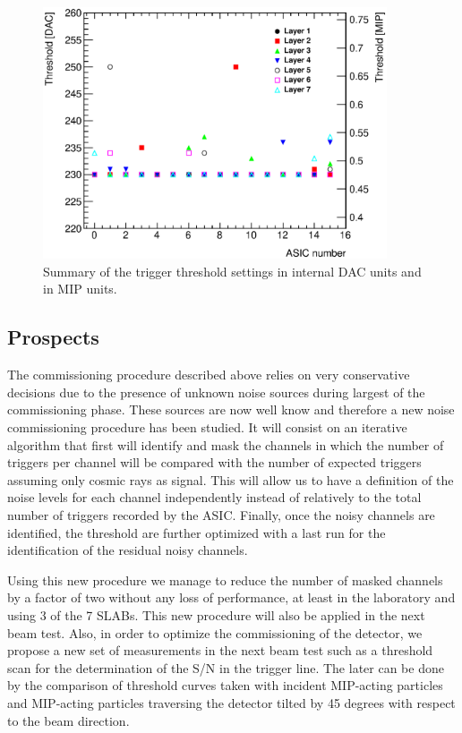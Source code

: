 \documentclass[a4paper,11pt]{article}
\begin{document}
\begin{figure}[!t]
  \centering
  \includegraphics[width=4in]{../figs/commissioning/threshold_chip.eps}
  \caption{Summary of the trigger threshold settings in internal DAC units and in MIP units.}
\label{trigger_thresholds}
\end{figure}


\subsection{Prospects}
\label{sec:comm_prospects}

The commissioning procedure described above relies on very conservative decisions
due to the presence of unknown noise sources during largest of the commissioning phase.
These sources are
now well know and therefore a new noise commissioning procedure has been studied.
It will consist on an iterative algorithm that first
will identify and mask the channels
in which the number of triggers per channel will be compared with the number of expected triggers
assuming only cosmic rays as signal. This will allow us to have a
definition of the noise levels for each channel independently
instead of relatively to the total number of triggers recorded by
the ASIC. Finally, once the noisy channels
are identified, the threshold  are further optimized
with a last run for the identification of the residual noisy channels.

Using this new procedure we manage to reduce the number of masked channels by a factor of two
without any loss of performance, at least in the laboratory and using 3 of the 7 SLABs.
This new procedure will also be applied in the next beam test.
Also, in order to
optimize the commissioning of the detector,
we propose a new set of measurements in the next beam test such as
a threshold scan for the determination of the S/N in the trigger line. The later
can be done by the comparison of threshold curves taken with incident MIP-acting particles
and MIP-acting particles traversing the detector tilted by 45 degrees with respect to the beam direction.
\end{document}
